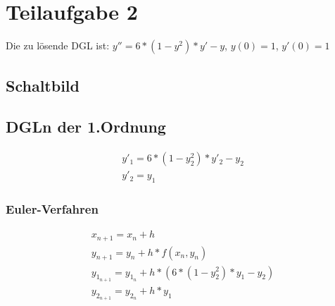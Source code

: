 \documentclass[]{scrartcl}
\begin{document}
\section{Teilaufgabe 2}
Die zu lösende DGL ist:
$ y'' = 6 * (1 - y^{2}) * y' - y $,
$ y(0) = 1 $,
$ y'(0) = 1 $

\subsection{Schaltbild}

\subsection{DGLn der 1.Ordnung}
\begin{align}
y'_{1} = 6 * (1 - y_{2}^{2}) * y'_{2} - y_{2} \\
y'_{2} = y_{1}
\end{align}

\subsubsection{Euler-Verfahren}
\begin{align}
x_{n+1} = x_{n}+h \\
y_{n+1} = y_{n}+h*f(x_{n},y_{n}) \\
y_{1_{n+1}} = y_{1_{n}}+h*(6 * (1 - y_{2}^{2}) * y_{1} - y_{2}) \\
y_{2_{n+1}} = y_{2_{n}} + h * y_{1}
\end{align}
\end{document}
